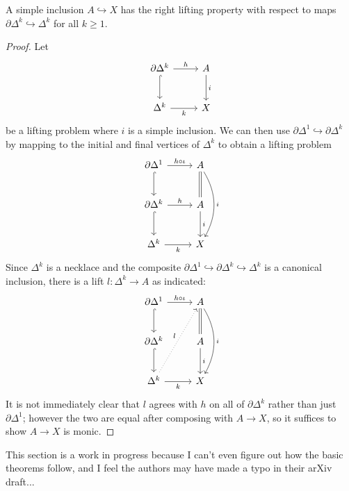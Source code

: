 \begin{lemma}\label{1.3.1.5}
	A simple inclusion $A\hookrightarrow X$ has the right lifting property with respect to maps $\partial \Delta ^k\hookrightarrow \Delta ^k$ for all $k\geq 1$.
\end{lemma}
\begin{proof}
	Let
	\[\begin{tikzcd}[row sep =  2.5em, column sep = 2.5em]
	\partial \Delta ^k \ar[" h ", r] \ar[hook, d]  & A \ar[" i ", d]  \\
	\Delta ^k \ar[" k "', r]  & X
	\end{tikzcd}\]
	be a lifting problem where $i$ is a simple inclusion. We can then use $\partial \Delta ^1 \hookrightarrow \partial \Delta ^k$ by mapping to the initial and final vertices of $\Delta ^k$ to obtain a lifting problem
	\[\begin{tikzcd}[row sep = 2.5em, column sep = 2.5em]
	\partial \Delta ^1 \ar[" h\circ \iota  ", r]\ar[hook, d]  & A \ar[equals, d] \ar[" i ", bend left, dd]  \\
	\partial \Delta ^k \ar[" h ", r] \ar[hook, d]  & A \ar[" i ", d]  \\
	\Delta ^k \ar[" k "', r]  & X
	\end{tikzcd}\]
	Since $\Delta ^k$ is a necklace and the composite $\partial \Delta ^1 \hookrightarrow \partial \Delta ^k \hookrightarrow \Delta ^k$ is a canonical inclusion, there is a lift $l : \Delta ^k \to A$ as indicated:
	\[\begin{tikzcd}[row sep = 2.5em, column sep = 2.5em]
	\partial \Delta ^1 \ar[" h\circ \iota  ", r]\ar[hook, d]  & A \ar[equals, d] \ar[" i ", bend left, dd]  \\
	\partial \Delta ^k \ar[hook, d]  & A \ar[" i ", d]  \\
	\Delta ^k \ar[" k "', r] \ar[" l ", dotted, uur]  & X
	\end{tikzcd}\]
	It is not immediately clear that $l$ agrees with $h$ on all of $\partial \Delta ^k$ rather than just $\partial \Delta ^1$; however the two are equal after composing with $A\to X$, so it suffices to show $A\to X$ is monic.
\end{proof}

This section is a work in progress because I can't even figure out how the basic theorems follow, and I feel the authors may have made a typo in their arXiv draft...
